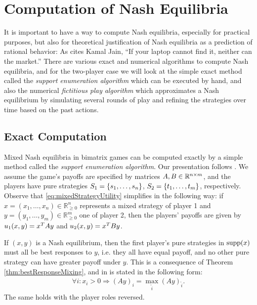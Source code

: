 \documentclass[a4paper]{scrreprt}
\newcommand{\Rp}{\mathbb{R}_{\geq 0}}
\theoremstyle{definition}
\begin{document}
    
    \section{Computation of Nash Equilibria}
    It is important to have a way to compute Nash equilibria, especially for practical purposes, but also for theoretical justification of Nash equilibria as a prediction of rational behavior: As \cite[p.30]{bib:nisanAlgorithmicGameTheoryCh2ComplexityNash} cites Kamal Jain, “If your laptop cannot
find it, neither can the market.” There are various exact and numerical algorithms to compute Nash equilibria, and for the two-player case we will look at the simple exact method called the \emph{support enumeration algorithm} which can be executed by hand, and also the numerical \emph{fictitious play algorithm} which approximates a Nash equilibrium by simulating several rounds of play and refining the strategies over time based on the past actions.
    
    \subsection{Exact Computation}
    \label{subsec:exactComputationNashEquilibriaSupportEnumerationAlgorithm}
    Mixed Nash equilibria in bimatrix games can be computed exactly by a simple method called the \emph{support enumeration algorithm}.
    Our presentation follows \cite{bib:nisanAlgorithmicGameTheoryCh3EquilibriumComputation}.
    We assume the game's payoffs are specified by matrices $A, B \in \mathbb{R}^{n\times m}$, and the players have pure strategies $S_1 = \{s_1,\dots,s_n\}$, $S_2 = \{t_1,\dots,t_m\}$, respectively.
    Observe that \eqref{eq:mixedStrategyUtility} simplifies in the following way: if $x = (x_1,\dots,x_n) \in \Rp^n$ represents a mixed strategy of player 1 and $y = (y_1,\dots,y_m) \in \Rp^m$ one of player 2, then the players' payoffs are given by $u_1(x,y) = x^{T} A y$ and $u_2(x,y) = x^{T} B y$. 
    
    If $(x, y)$ is a Nash equilibrium, then the first player's pure strategies in $\operatorname{supp}(x)$ must all be best responses to $y$, i.e. they all have equal payoff, and no other pure strategy can have greater payoff under $y$. This is a consequence of Theorem \ref{thm:bestResponseMixing}, and in \cite[p.55]{bib:nisanAlgorithmicGameTheoryCh3EquilibriumComputation} is stated in the following form:
    \begin{gather}
        \forall i: x_i > 0 \Rightarrow (Ay)_i = \max_{\tilde{i}} (Ay)_{\tilde{i}}.
        \label{eq:equalMaxPureStrategyPayoffsLinearSystem}
    \end{gather}
    The same holds with the player roles reversed.
    
\end{document}
